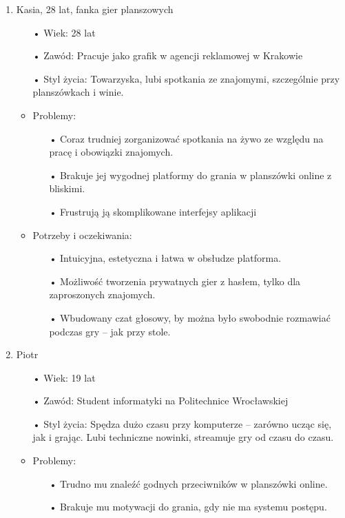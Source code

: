\documentclass[12pt,a4paper,colorlinks=true,linkcolor=NavyBlue,citecolor=red,urlcolor=NavyBlue]{book}
\begin{document}
\begin{enumerate}
    \item Kasia, 28 lat, fanka gier planszowych
    \begin{itemize}
        \item[•] Wiek: 28 lat
        \item[•] Zawód: Pracuje jako grafik w agencji reklamowej w Krakowie
        \item[•]Styl życia: Towarzyska, lubi spotkania ze znajomymi, szczególnie przy planszówkach i winie.
        \item Problemy:
        \begin{itemize}
            \item[•] Coraz trudniej zorganizować spotkania na żywo ze względu na pracę i obowiązki znajomych.
            \item[•] Brakuje jej wygodnej platformy do grania w planszówki online z bliskimi.
            \item[•] Frustrują ją skomplikowane interfejsy aplikacji
        \end{itemize}
        \item Potrzeby i oczekiwania:
        \begin{itemize}
            \item[•] Intuicyjna, estetyczna i łatwa w obsłudze platforma.
            \item[•] Możliwość tworzenia prywatnych gier z hasłem, tylko dla zaproszonych znajomych.
            \item[•] Wbudowany czat głosowy, by można było swobodnie rozmawiać podczas gry – jak przy stole.
        \end{itemize}
    \end{itemize}
    \item Piotr
    \begin{itemize}
        \item[•] Wiek: 19 lat
        \item[•] Zawód: Student informatyki na Politechnice Wrocławskiej
        \item[•]Styl życia: Spędza dużo czasu przy komputerze – zarówno ucząc się, jak i grając. Lubi techniczne nowinki, streamuje gry od czasu do czasu.
        \item Problemy:
        \begin{itemize}
            \item[•] Trudno mu znaleźć godnych przeciwników w planszówki online.
            \item[•] Brakuje mu motywacji do grania, gdy nie ma systemu postępu.

\end{itemize}
\end{itemize}
\end{enumerate}
\end{document}
